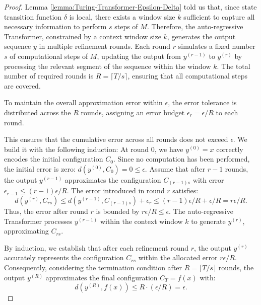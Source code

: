 \begin{proof}
Lemma \ref{lemma:Turing-Transformer-Epsilon-Delta}
told us that, since state transition function  \( \delta \) is local,%
there exists a window size \( k \) sufficient to capture all necessary information to perform \( s \) steps of \( M \). 
 Therefore, the auto-regressive Transformer, constrained by a context window size \( k \), generates the output sequence \( y \) in multiple refinement rounds. Each round \( r \) simulates a fixed number \( s \) of computational steps of \( M \), updating the output from \( y^{(r-1)} \) to \( y^{(r)} \) by processing the relevant segment of the sequence within the window \( k \). The total number of required rounds is \( R = \lceil T / s \rceil \), ensuring that all computational steps are covered.

To maintain the overall approximation error within \( \epsilon \), the error tolerance is distributed across the \( R \) rounds, assigning an error budget \( \epsilon_r = \epsilon / R \) to each round. 

 This ensures that the cumulative error across all rounds does not exceed \( \epsilon \).  
We build it with the following induction: At round 0, we have \( y^{(0)} = x \) correctly encodes the initial configuration \( C_0 \). Since no computation has been performed, the initial error is zero:
  \(
  d(y^{(0)}, C_0) = 0 \leq \epsilon.
  \)
Assume that after \( r-1 \) rounds, the output \( y^{(r-1)} \) approximates the configuration \( C_{(r-1)s} \) with error \( \epsilon_{r-1} \leq (r-1)\epsilon / R \). The error introduced in round \( r \) satisfies:
  \[
  d(y^{(r)}, C_{rs}) \leq d(y^{(r-1)}, C_{(r-1)s}) + \epsilon_r \leq (r-1)\epsilon / R + \epsilon / R = r\epsilon / R.
  \]
  Thus, the error after round \( r \) is bounded by \( r\epsilon / R \leq \epsilon \). The auto-regressive Transformer processes \( y^{(r-1)} \) within the context window \( k \) to generate \( y^{(r)} \), approximating \( C_{rs} \). 

By induction, we establish that after each refinement round \( r \), the output \( y^{(r)} \) accurately represents the configuration \( C_{rs} \) within the allocated error \( r\epsilon / R \).  Consequently, considering the termination condition after \( R = \lceil T / s \rceil \) rounds, the output \( y^{(R)} \) approximates the final configuration \( C_T = f(x) \) with:
\[
d(y^{(R)}, f(x)) \leq R \cdot (\epsilon / R) = \epsilon.
\]
\end{proof}

